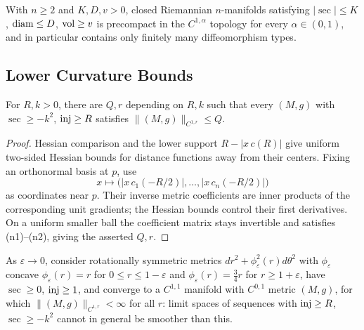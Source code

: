 \begin{corollary}
  \label{cor:pet-ch11-cheeger-diam-vol-finiteness}

  With $n\ge2$ and $K,D,v>0$, closed Riemannian $n$-manifolds satisfying
  $|\sec|\le K$, $\operatorname{diam}\le D$, $\operatorname{vol}\ge v$ is precompact in the $C^{1,\alpha}$
  topology for every $\alpha\in(0,1)$, and in particular contains only
  finitely many diffeomorphism types.
\end{corollary}

\subsection{Lower Curvature Bounds}

\begin{theorem}
  \label{thm:pet-ch11-lower-sec-bound-injectivity-norm-control}

  For $R,k>0$, there are $Q,r$ depending on $R,k$ such that every $(M,g)$
  with $\sec\ge-k^2$, $\operatorname{inj}\ge R$ satisfies $\|(M,g)\|_{C^{1,r}}\le Q$.
\end{theorem}
\begin{proof}
  \sketch
  Hessian comparison and the lower support \(R-|x\,c(R)|\) give uniform two-sided Hessian bounds for distance functions away from their centers. Fixing an orthonormal basis at \(p\), use
  \[
    x\longmapsto\bigl(|x\,c_1(-R/2)|,\ldots,|x\,c_n(-R/2)|\bigr)
  \]
  as coordinates near \(p\). Their inverse metric coefficients are inner products of the corresponding unit gradients; the Hessian bounds control their first derivatives. On a uniform smaller ball the coefficient matrix stays invertible and satisfies (n1)--(n2), giving the asserted \(Q,r\).
\end{proof}


\begin{example}
  \label{ex:pet-ch11-optimality-lower-curvature-example}

  As $\varepsilon\to0$, consider rotationally symmetric metrics
  $dr^2+\phi_\varepsilon^2(r)d\theta^2$ with $\phi_\varepsilon$ concave
  $\phi_\varepsilon(r)=r$ for $0\le r\le1-\varepsilon$ and
  $\phi_\varepsilon(r)=\tfrac34r$ for $r\ge1+\varepsilon$, have $\sec\ge0$,
  $\operatorname{inj}\ge1$, and converge to a $C^{1,1}$ manifold with $C^{0,1}$ metric
  $(M,g)$, for which $\|(M,g)\|_{C^{1,r}}<\infty$ for all $r$: limit spaces
  of sequences with $\operatorname{inj}\ge R$, $\sec\ge-k^2$ cannot in general be smoother
  than this.
\end{example}

